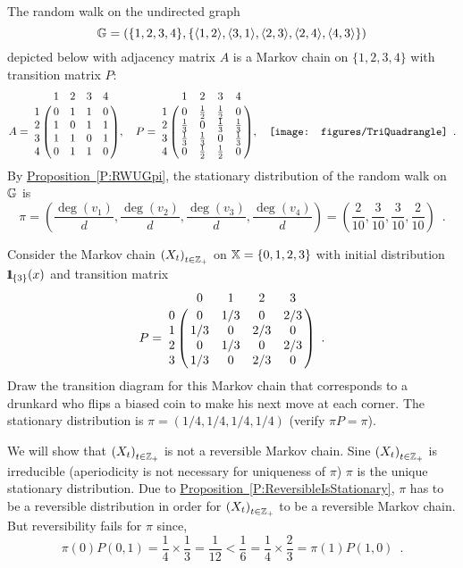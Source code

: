 {\begin{example}\label{EX:TriangulatedQuadrangle}
The random walk on the undirected graph 
$$\mathbb{G}=(\{1,2,3,4\}, \{\langle 1,2 \rangle, \langle 3,1 \rangle, \langle 2,3 \rangle, \langle 2,4 \rangle, \langle 4,3\rangle\})$$ depicted below with adjacency matrix $A$ is a Markov chain on $\{1,2,3,4\}$ with transition matrix $P$:
$$ 
A = 
\bordermatrix{~ & 1 & 2 & 3 & 4 \cr
1 & 0 & 1 & 1 & 0 \cr
2 & 1 & 0 & 1 & 1\cr
3 & 1 & 1 & 0 & 1\cr
4 & 0 & 1 & 1 & 0} ,
\quad
P = 
\bordermatrix{~ & 1 & 2 & 3 & 4 \cr
1 & 0 & \frac{1}{2} &  \frac{1}{2} & 0 \cr
2 & \frac{1}{3} & 0 &  \frac{1}{3} &  \frac{1}{3} \cr
3 & \frac{1}{3} &  \frac{1}{3} & 0 &  \frac{1}{3} \cr
4 & 0 &  \frac{1}{2} &  \frac{1}{2} & 0 } ,
\quad
\makebox{\texttt{[image: figures/TriQuadrangle]}}
\enspace .$$ 
By \hyperref[P:RWUGpi]{Proposition~\ref*{P:RWUGpi}}, the stationary distribution of the random walk on $\mathbb{G}$ is
\[
\pi = \left( \frac{\deg(v_1)}{d}, \frac{\deg(v_2)}{d}, \frac{\deg(v_3)}{d}, \frac{\deg(v_4)}{d} \right) 
= \left( \frac{2}{10}, \frac{3}{10}, \frac{3}{10}, \frac{2}{10} \right) \enspace .
\] 
\end{example}


\begin{example}\label{SIM:DrunkardsBiasedWalkBlock}
Consider the Markov chain $\left(X_t\right)_{t \in \mathbb{Z}_+}$ on $\mathbb{X}=\{0,1,2,3\}$ with initial distribution ${1}\mspace{-11 mu}{1}_{\{3\}}(x)$ and transition matrix 
$$P = 
\bordermatrix{~ & 0 & 1 & 2 & 3 \cr 
0 & 0 & 1/3 & 0 & 2/3\cr
1 & 1/3 & 0 & 2/3 & 0\cr
2 & 0 & 1/3 & 0 & 2/3\cr
3 & 1/3 & 0 & 2/3 & 0 } \enspace .
$$
Draw the transition diagram for this Markov chain that corresponds to a drunkard who flips a biased coin to make his next move at each corner.  The stationary distribution is $\pi = (1/4,1/4,1/4,1/4)$ (verify $\pi P= \pi$).  

We will show that $\left(X_t\right)_{t \in \mathbb{Z}_+}$ is not a reversible Markov chain.  
Sine $\left(X_t\right)_{t \in \mathbb{Z}_+}$ is irreducible (aperiodicity is not necessary for uniqueness of $\pi$) $\pi$ is the unique stationary distribution.  
Due to \hyperref[P:ReversibleIsStationary]{Proposition~\ref*{P:ReversibleIsStationary}}, $\pi$ has to be a reversible distribution in order for $\left(X_t\right)_{t \in \mathbb{Z}_+}$ to be a reversible Markov chain.  
But reversibility fails for $\pi$ since,
\[
\pi(0) P(0,1) = \frac{1}{4} \times \frac{1}{3} = \frac{1}{12} < \frac{1}{6} = \frac{1}{4} \times \frac{2}{3} = \pi(1)P(1,0) \enspace .
\]
\end{example}

}
